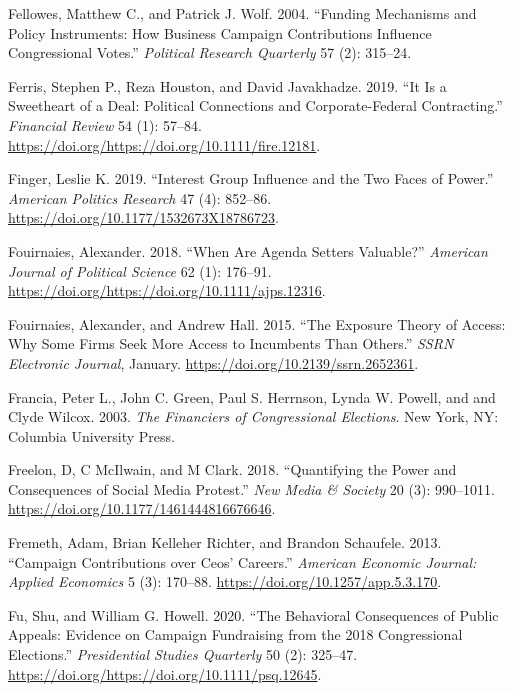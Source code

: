 \documentclass[12pt,]{article}
\begin{document}
\leavevmode\hypertarget{ref-fellowes2004}{}%
Fellowes, Matthew C., and Patrick J. Wolf. 2004. ``Funding Mechanisms
and Policy Instruments: How Business Campaign Contributions Influence
Congressional Votes.'' \emph{Political Research Quarterly} 57 (2):
315--24.

\leavevmode\hypertarget{ref-ferris2019}{}%
Ferris, Stephen P., Reza Houston, and David Javakhadze. 2019. ``It Is a
Sweetheart of a Deal: Political Connections and Corporate-Federal
Contracting.'' \emph{Financial Review} 54 (1): 57--84.
\url{https://doi.org/https://doi.org/10.1111/fire.12181}.

\leavevmode\hypertarget{ref-finger2019}{}%
Finger, Leslie K. 2019. ``Interest Group Influence and the Two Faces of
Power.'' \emph{American Politics Research} 47 (4): 852--86.
\url{https://doi.org/10.1177/1532673X18786723}.

\leavevmode\hypertarget{ref-fouirnaies2018}{}%
Fouirnaies, Alexander. 2018. ``When Are Agenda Setters Valuable?''
\emph{American Journal of Political Science} 62 (1): 176--91.
\url{https://doi.org/https://doi.org/10.1111/ajps.12316}.

\leavevmode\hypertarget{ref-fouirnaies2015}{}%
Fouirnaies, Alexander, and Andrew Hall. 2015. ``The Exposure Theory of
Access: Why Some Firms Seek More Access to Incumbents Than Others.''
\emph{SSRN Electronic Journal}, January.
\url{https://doi.org/10.2139/ssrn.2652361}.

\leavevmode\hypertarget{ref-francia2003}{}%
Francia, Peter L., John C. Green, Paul S. Herrnson, Lynda W. Powell, and
and Clyde Wilcox. 2003. \emph{The Financiers of Congressional
Elections}. New York, NY: Columbia University Press.

\leavevmode\hypertarget{ref-freelon2018}{}%
Freelon, D, C McIlwain, and M Clark. 2018. ``Quantifying the Power and
Consequences of Social Media Protest.'' \emph{New Media \& Society} 20
(3): 990--1011. \url{https://doi.org/10.1177/1461444816676646}.

\leavevmode\hypertarget{ref-fremeth2013}{}%
Fremeth, Adam, Brian Kelleher Richter, and Brandon Schaufele. 2013.
``Campaign Contributions over Ceos' Careers.'' \emph{American Economic
Journal: Applied Economics} 5 (3): 170--88.
\url{https://doi.org/10.1257/app.5.3.170}.

\leavevmode\hypertarget{ref-fu2020}{}%
Fu, Shu, and William G. Howell. 2020. ``The Behavioral Consequences of
Public Appeals: Evidence on Campaign Fundraising from the 2018
Congressional Elections.'' \emph{Presidential Studies Quarterly} 50 (2):
325--47. \url{https://doi.org/https://doi.org/10.1111/psq.12645}.
\end{document}
